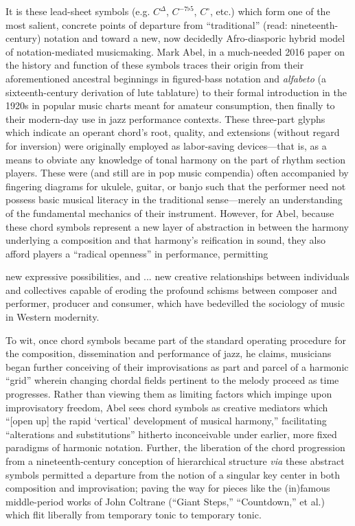     It is these lead-sheet symbols (e.g. $C^{\Delta}$, $C^{-7\flat5}$, $C^{\circ}$, etc.) which form one of the most salient, concrete points of departure from ``traditional'' (read: nineteenth-century) notation and toward a new, now decidedly Afro-diasporic hybrid model of notation-mediated musicmaking. Mark Abel, in a much-needed 2016 paper on the history and function of these symbols traces their origin from their aforementioned ancestral beginnings in figured-bass notation and \textit{alfabeto} (a sixteenth-century derivation of lute tablature) to their formal introduction in the 1920s in popular music charts meant for amateur consumption, then finally to their modern-day use in jazz performance contexts. These three-part glyphs which indicate an operant chord's root, quality, and extensions (without regard for inversion) were originally employed as labor-saving devices---that is, as a means to obviate any knowledge of tonal harmony on the part of rhythm section players. These were (and still are in pop music compendia) often  accompanied by fingering diagrams for ukulele, guitar, or banjo such that the performer need not possess basic musical literacy in the traditional sense---merely an understanding of the fundamental mechanics of their instrument. However, for Abel, because these chord symbols represent a new layer of abstraction in between the harmony underlying a composition and that harmony's reification in sound, they also afford players a ``radical openness'' in performance, permitting 
    
        \begin{smallquote}
            new expressive possibilities, and ... new creative relationships between individuals and collectives capable of eroding the profound schisms between composer and performer, producer and consumer, which have bedevilled the sociology of music in Western modernity.\autocite{Abel_2016}
        \end{smallquote}

    To wit, once chord symbols became part of the standard operating procedure for the composition, dissemination and performance of jazz, he claims, musicians began further conceiving of their improvisations as part and parcel of a harmonic ``grid'' wherein changing chordal fields pertinent to the melody proceed as time progresses. Rather than viewing them as limiting factors which impinge upon improvisatory freedom, Abel sees chord symbols as creative mediators which ``[open up] the rapid `vertical' development of musical harmony,'' facilitating ``alterations and substitutions'' hitherto inconceivable under earlier, more fixed paradigms of harmonic notation. Further, the liberation of the chord progression from a nineteenth-century conception of hierarchical structure \textit{via} these abstract symbols permitted a departure from the notion of a singular key center in both composition and improvisation; paving the way for pieces like the (in)famous middle-period works of John Coltrane (``Giant Steps,'' ``Countdown,'' et al.) which flit liberally from temporary tonic to temporary tonic.
    
